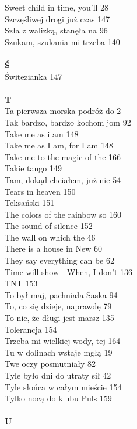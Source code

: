\documentclass[a5paper, 10pt]{book}
\begin{document}
{\begin{multicols}{3}
    Sweet child in time, you'll 28\\
    Szczęśliwej drogi już czas 147\\
    Szła z walizką, stanęła na 96\\
    Szukam, szukania mi trzeba 140\\
    \\
    {\footnotesize \textbf{Ś\\} }
    Świtezianka 147\\
    \\
    {\footnotesize \textbf{T\\} }
    Ta pierwsza morska podróż do 2\\
    Tak bardzo, bardzo kochom jom 92\\
    Take me as i am 148\\
    Take me as I am, for I am 148\\
    Take me to the magic of the 166\\
    Takie tango 149\\
    Tam, dokąd chciałem, już nie 54\\
    Tears in heaven 150\\
    Teksański 151\\
    The colors of the rainbow so 160\\
    The sound of silence 152\\
    The wall on which the 46\\
    There is a house in New 60\\
    They say everything can be 62\\
    Time will show - When, I don't 136\\
    TNT 153\\
    To był maj, pachniała Saska 94\\
    To, co się dzieje, naprawdę 79\\
    To nic, że długi jest marsz 135\\
    Tolerancja 154\\
    Trzeba mi wielkiej wody, tej 164\\
    Tu w dolinach wstaje mgłą 19\\
    Twe oczy posmutniały 82\\
    Tyle było dni do utraty sił 42\\
    Tyle słońca w całym mieście 154\\
    Tylko nocą do klubu Puls 159\\
    \\
    {\footnotesize \textbf{U\\} }

\end{multicols}}
\end{document}
